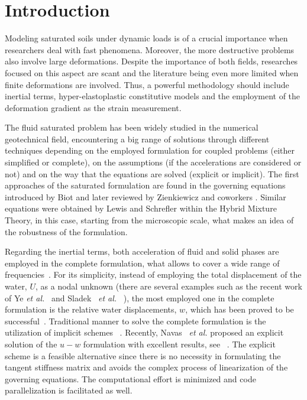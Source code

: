 \documentclass[twocolumn]{svjour3}          %
\newcommand{\etal}{
  \textit{et al.}
}
\begin{document}
\section{Introduction}
\label{intro}

Modeling saturated soils under dynamic loads is of a crucial importance when researchers deal with fast phenomena. Moreover, the more destructive problems also involve large deformations. Despite the importance of both fields, researches focused on this aspect are scant and the literature being even more limited when finite deformations are involved. Thus, a powerful methodology should include inertial terms, hyper-elastoplastic constitutive models and the employment of the deformation gradient as the strain measurement.

The fluid saturated problem has been widely studied in the numerical geotechnical field, encountering a big range of solutions through different techniques depending on the employed formulation for coupled problems (either simplified or complete), on the assumptions (if the accelerations are considered or not) and on the way that the equations are solved (explicit or implicit). The first approaches of the saturated formulation are found in the governing equations introduced by Biot \cite{Biot1956} and later reviewed by   Zienkiewicz and coworkers \cite{Zienkiewicz99,zienkiewicz1980,zienkiewicz1984,zienkiewicz1990a}. Similar equations were obtained by Lewis and Schrefler \cite{LewisSchrefler98} within the Hybrid Mixture Theory, in this case, starting from the microscopic scale, what makes an idea of the robustness of the formulation.

Regarding the inertial terms, both acceleration of fluid and solid phases are employed in the complete formulation, what allows to cover a wide range of frequencies~\cite{Jeremic08,Muraleetharan09}. For its simplicity, instead of employing the total displacement of the water, $U$, as a nodal unknown (there are several examples such as the recent work of Ye {\it et al.}~\cite{Ye2014} and Sladek~\etal~\cite{Sladek2014}), the most employed one in the complete formulation is the relative water displacements, $w$, which has been proved to be successful~\cite{LopezQuerolB2006,Navas2016}. Traditional manner to solve the complete formulation is the utilization of implicit schemes~\cite{borja95,borja98,Armero99,Ehlers:99,Navas:17c} . Recently, Navas~\etal proposed an explicit solution of the $u-w$ formulation with excellent results, see ~\cite{Navas:17b}. The explicit scheme is a feasible alternative since there is no necessity in formulating the tangent stiffness matrix and avoids the complex process of  linearization of the governing equations. The computational effort is minimized and code parallelization is facilitated as well.
\end{document}
